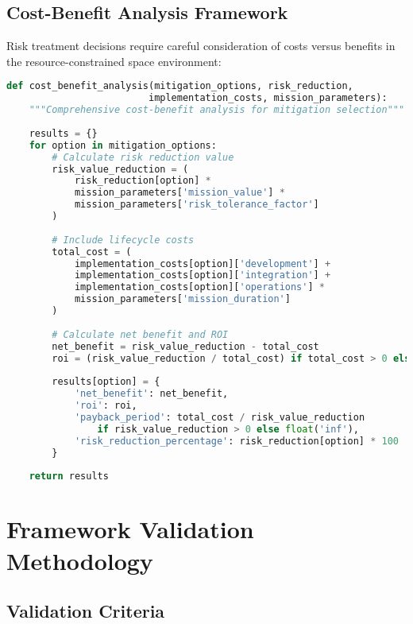 \documentclass[binding=0.6cm]{sapthesis}
\begin{document}
\subsection{Cost-Benefit Analysis Framework}

Risk treatment decisions require careful consideration of costs versus benefits in the resource-constrained space environment:

\begin{lstlisting}[language=Python, caption=Cost-Benefit Analysis for Risk Mitigation]
def cost_benefit_analysis(mitigation_options, risk_reduction, 
                         implementation_costs, mission_parameters):
    """Comprehensive cost-benefit analysis for mitigation selection"""
    
    results = {}
    for option in mitigation_options:
        # Calculate risk reduction value
        risk_value_reduction = (
            risk_reduction[option] * 
            mission_parameters['mission_value'] *
            mission_parameters['risk_tolerance_factor']
        )
        
        # Include lifecycle costs
        total_cost = (
            implementation_costs[option]['development'] +
            implementation_costs[option]['integration'] +
            implementation_costs[option]['operations'] *
            mission_parameters['mission_duration']
        )
        
        # Calculate net benefit and ROI
        net_benefit = risk_value_reduction - total_cost
        roi = (risk_value_reduction / total_cost) if total_cost > 0 else float('inf')
        
        results[option] = {
            'net_benefit': net_benefit,
            'roi': roi,
            'payback_period': total_cost / risk_value_reduction 
                if risk_value_reduction > 0 else float('inf'),
            'risk_reduction_percentage': risk_reduction[option] * 100
        }
    
    return results
\end{lstlisting}

\section{Framework Validation Methodology}

\subsection{Validation Criteria}
\end{document}
